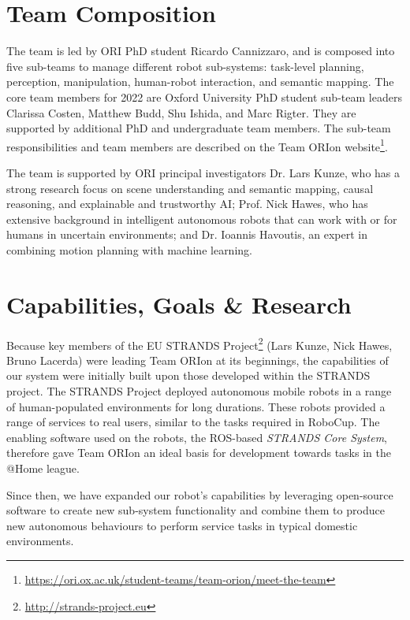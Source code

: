 \documentclass[runningheads,a4paper]{llncs}
\newcommand{\teamori}{Team ORIon}
\newcommand{\competitionyear}{2022}
\newcommand{\robocuptitleshort}{RoboCup \competitionyear}
\begin{document}
\section{Team Composition}
The team is led by ORI PhD student Ricardo Cannizzaro, and is composed into five sub-teams to manage different robot sub-systems: task-level planning, perception, manipulation, human-robot interaction, and semantic mapping. The core team members for 2022 are Oxford University PhD student sub-team leaders Clarissa Costen, Matthew Budd, Shu Ishida, and Marc Rigter. They are supported by additional PhD and undergraduate team members. The sub-team responsibilities and team members are described on the \teamori{} website\footnote{\url{https://ori.ox.ac.uk/student-teams/team-orion/meet-the-team}}.

The team is supported by ORI principal investigators Dr. Lars Kunze, who has a strong research focus on scene understanding and semantic mapping, causal reasoning, and explainable and trustworthy AI; Prof. Nick Hawes, who has extensive background in intelligent autonomous robots that can work with or for humans in uncertain environments; and Dr. Ioannis Havoutis, an expert in combining motion planning with machine learning.

\section{Capabilities, Goals \& Research}

Because key members of the EU STRANDS Project\footnote{\url{http://strands-project.eu}} (Lars Kunze, Nick Hawes, Bruno Lacerda) were leading \teamori{} at its beginnings, the capabilities of our system were initially built upon those developed within the STRANDS project. The STRANDS Project deployed autonomous mobile robots in a range of human-populated environments for long durations. These robots provided a range of services to real users, similar to the tasks required in RoboCup. The enabling software used on the robots, the ROS-based \emph{STRANDS Core System}, therefore gave \teamori{} an ideal basis for development towards tasks in the @Home league. 

Since then, we have expanded our robot's capabilities by leveraging open-source software to create new sub-system functionality and combine them to produce new autonomous behaviours to perform service tasks in typical domestic environments.
\end{document}
